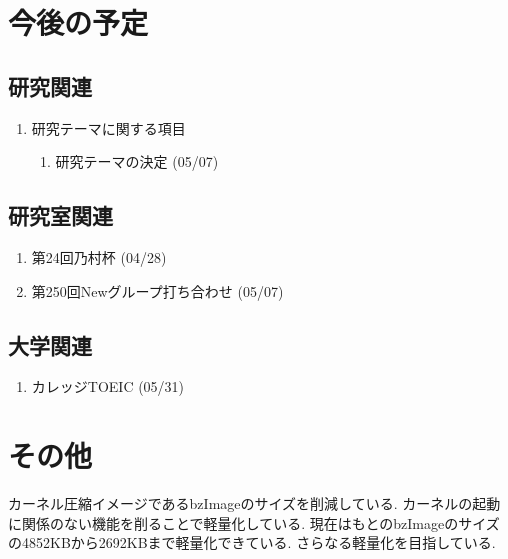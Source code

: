 \documentclass[fleqn, 14pt]{extarticle}
\begin{document}
\section{今後の予定}
\label{sec-4}
\subsection{研究関連}
\label{sec-4-1}

\begin{enumerate}
\item 研究テーマに関する項目
\hfill
\begin{enumerate}

\item 研究テーマの決定
\hfill
(05/07)

\end{enumerate}
\end{enumerate}

\subsection{研究室関連}
\label{sec-4-2}

\begin{enumerate}
\item 第24回乃村杯
\hfill
\label{enum-3}
(04/28)
\item 第250回Newグループ打ち合わせ
\hfill
\label{enum-4}
(05/07)
\end{enumerate}
\subsection{大学関連}
\begin{enumerate}
\item カレッジTOEIC
\hfill
\label{enum-5}
(05/31)
\end{enumerate}
\section{その他}
\label{sec-5}
カーネル圧縮イメージであるbzImageのサイズを削減している.
カーネルの起動に関係のない機能を削ることで軽量化している.
現在はもとのbzImageのサイズの4852KBから2692KBまで軽量化できている.
さらなる軽量化を目指している.
\end{document}
